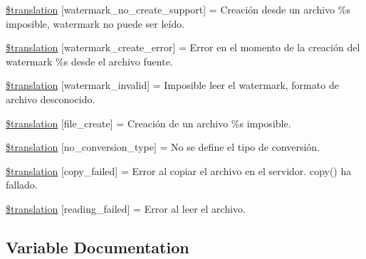 \begin{DoxyCompactItemize}
\item 
\hyperlink{class_8upload_8es___e_s_8php_a82d5853430ab72dc1f9799ec36144cc6}{\$translation} \mbox{[}\textquotesingle{}watermark\+\_\+no\+\_\+create\+\_\+support\textquotesingle{}\mbox{]} = \textquotesingle{}Creación desde un archivo \%s imposible, watermark no puede ser leído.\textquotesingle{}
\item 
\hyperlink{class_8upload_8es___e_s_8php_aabca0b65dadbc6184415c16375f284ca}{\$translation} \mbox{[}\textquotesingle{}watermark\+\_\+create\+\_\+error\textquotesingle{}\mbox{]} = \textquotesingle{}Error en el momento de la creación del watermark \%s desde el archivo fuente.\textquotesingle{}
\item 
\hyperlink{class_8upload_8es___e_s_8php_ac336e7a5701e47ba4a05e9e498a3cc44}{\$translation} \mbox{[}\textquotesingle{}watermark\+\_\+invalid\textquotesingle{}\mbox{]} = \textquotesingle{}Imposible leer el watermark, formato de archivo desconocido.\textquotesingle{}
\item 
\hyperlink{class_8upload_8es___e_s_8php_a1ecb4673e4fb69e06b3f20b65cecf30a}{\$translation} \mbox{[}\textquotesingle{}file\+\_\+create\textquotesingle{}\mbox{]} = \textquotesingle{}Creación de un archivo \%s imposible.\textquotesingle{}
\item 
\hyperlink{class_8upload_8es___e_s_8php_a4712d7ec28e9a7f17eb3338af2358363}{\$translation} \mbox{[}\textquotesingle{}no\+\_\+conversion\+\_\+type\textquotesingle{}\mbox{]} = \textquotesingle{}No se define el tipo de conversión.\textquotesingle{}
\item 
\hyperlink{class_8upload_8es___e_s_8php_a783c9358bcf54a054545b50098bc679b}{\$translation} \mbox{[}\textquotesingle{}copy\+\_\+failed\textquotesingle{}\mbox{]} = \textquotesingle{}Error al copiar el archivo en el servidor. copy() ha fallado.\textquotesingle{}
\item 
\hyperlink{class_8upload_8es___e_s_8php_a01bea14c9fd5f353f62db44beabfcd42}{\$translation} \mbox{[}\textquotesingle{}reading\+\_\+failed\textquotesingle{}\mbox{]} = \textquotesingle{}Error al leer el archivo.\textquotesingle{}
\end{DoxyCompactItemize}


\subsection{Variable Documentation}
\hypertarget{class_8upload_8es___e_s_8php_a1f198d410fecc3871ebdd468d343a5e3}{}

